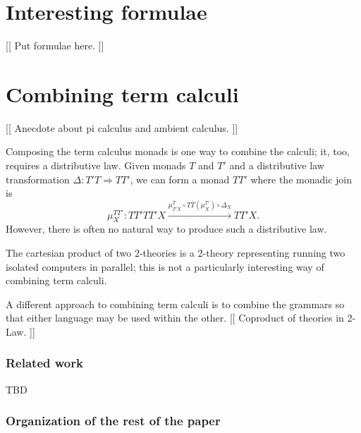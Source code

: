 \documentclass[]{acm_proc_article-sp}
\numberwithin{equation}{subsection}
\newcommand{\pic}{$\pi$-calculus}
\begin{document}
\section{Interesting formulae}

\begin{comment}
  * Examples of interesting formulae

      * primes in a monoid

      * deadlock-free (both kinds)

      * datalock-free? http://erights.org/elang/concurrency/epimenides.html

      * deniability from paper with Drossopolou

      * more?  
\end{comment}

[[ Put formulae here. ]]

\section{Combining term calculi}

[[ Anecdote about pi calculus and ambient calculus. ]]

Composing the term calculus monads is one way to combine the calculi; it, too, requires a distributive law.  Given monads $T$ and $T'$ and a distributive law transformation $\Delta\colon T'T \Rightarrow TT'$, we can form a monad $TT'$ where the monadic join is
\[ \mu^{TT'}_X\colon TT'TT'X \xrightarrow{\mu^T_{T'X} \circ TT(\mu^{T'}_X) \circ \Delta_X} TT'X. \]
However, there is often no natural way to produce such a distributive law.

The cartesian product of two 2-theories is a 2-theory representing running two isolated computers in parallel; this is not a particularly interesting way of combining term calculi.

A different approach to combining term calculi is to combine the grammars so that either language may be used within the other.  [[ Coproduct of theories in 2-Law. ]]

\subsubsection{Related work}


TBD

\subsubsection{Organization of the rest of the paper}
\end{document}
